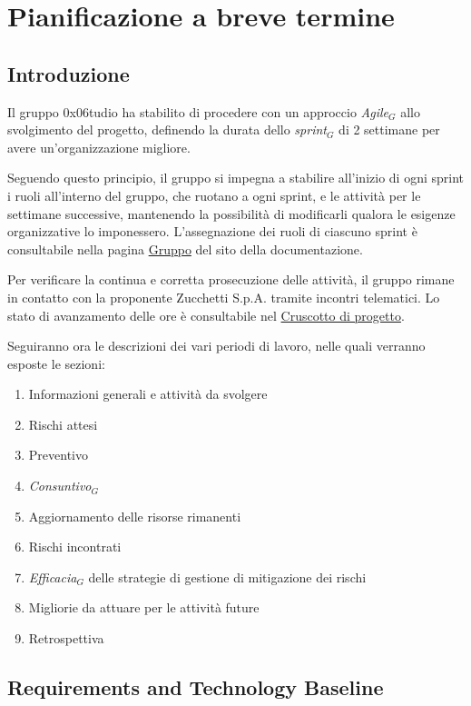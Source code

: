 \documentclass[a4paper, 11pt]{article}
\newcommand{\term}[1]{\textit{#1}$_G$} %
\newcommand{\tbd}[1]{\colorbox{yellow!60}{#1}}
\begin{document}
\section{Pianificazione a breve termine}

\subsection{Introduzione}
Il gruppo 0x06tudio ha stabilito di procedere con un approccio \term{Agile} allo svolgimento del progetto, definendo la durata dello \term{sprint} di \tbd{2 settimane} per avere un'organizzazione migliore.

Seguendo questo principio, il gruppo si impegna a stabilire all'inizio di ogni sprint i ruoli all'interno del gruppo, che ruotano a ogni sprint, e le attività per le settimane successive, mantenendo la possibilità di modificarli qualora le esigenze organizzative lo imponessero. L'assegnazione dei ruoli di ciascuno sprint è consultabile nella pagina \href{https://0x06tudio.github.io/docs/html/gruppo.html}{Gruppo} del sito della documentazione.

Per verificare la continua e corretta prosecuzione delle attività, il gruppo rimane in contatto con la proponente Zucchetti S.p.A. tramite incontri telematici. Lo stato di avanzamento delle ore è consultabile nel \href{https://0x06tudio.github.io/docs/html/cruscotto.html}{Cruscotto di progetto}.

Seguiranno ora le descrizioni dei vari periodi di lavoro, nelle quali verranno esposte le sezioni:
\begin{enumerate}[noitemsep]
    \item Informazioni generali e attività da svolgere
    \item Rischi attesi
    \item Preventivo
    \item \term{Consuntivo}
    \item Aggiornamento delle risorse rimanenti
    \item Rischi incontrati
    \item \term{Efficacia} delle strategie di gestione di mitigazione dei rischi
    \item Migliorie da attuare per le attività future
    \item Retrospettiva
\end{enumerate}

\subsection{Requirements and Technology Baseline}
\end{document}
